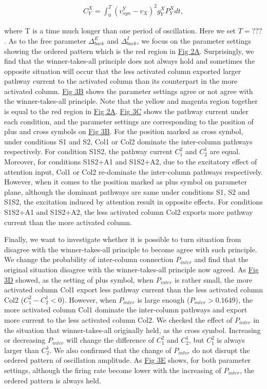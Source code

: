 \documentclass[10pt,letterpaper]{article}
\begin{document}
\begin{eqnarray}
\label{eq:6}
    C_{Y}^{X} = \int_{0}^{T}(v_{syn}^{Y}-v_{X})^{2}g_{Y}^{X}P_{Y}^{X}dt,
\end{eqnarray}

where T is a time much longer than one period of oscillation. Here we set $T=???$. As to the free parameter $\Delta_{back}^{E}$ and $\Delta_{back}^{I}$, we focus on the parameter settings showing the ordered pattern which is the red region in \hyperlink{fig:fig2}{Fig 2A}. Surprisingly, we find that the winner-takes-all principle does not always hold and sometimes the opposite situation will occur that the less activated column exported larger pathway current to the activated column than its counterpart in the more activated column. \hyperlink{fig:fig3}{Fig 3B} shows the parameter settings agree or not agree with the winner-takes-all principle. Note that the yellow and magenta region together is equal to the red region in \hyperlink{fig:fig2}{Fig 2A}. \hyperlink{fig:fig3}{Fig 3C} shows the pathway current under each condition, and the parameter settings are corresponding to the position of plus and cross symbols on \hyperlink{fig:fig3}{Fig 3B}. For the position marked as cross symbol, under conditions S1 and S2, Col1 or Col2 dominate the inter-column pathways respectively. For condition S1S2, the pathway current $C_{1}^{2}$ and $C_{2}^{1}$ are equal. Moreover, for conditions S1S2+A1 and S1S2+A2, due to the excitatory effect of attention input, Col1 or Col2 re-dominate the inter-column pathways respectively. However, when it comes to the position marked as plus symbol on parameter plane, although the dominant pathways are same under conditions S1, S2 and S1S2, the excitation induced by attention result in opposite effects. For conditions S1S2+A1 and S1S2+A2, the less activated column Col2 exports more pathway current than the more activated column.

Finally, we want to investigate whether it is possible to turn situation from disagree with the winner-takes-all principle to become agree with such principle. We change the probability of inter-column connection $P_{inter}$ and find that the original situation disagree with the winner-takes-all principle now agreed. As \hyperlink{fig:fig3}{Fig 3D} showed, as the setting of plus symbol, when $P_{inter}$ is rather small, the more activated column Col1 export less pathway current than the less activated column Col2 ($C_{1}^{2} - C_{2}^{1} < 0$). However, when $P_{inter}$ is large enough ($P_{inter}>0.1649$), the more activated column Col1 dominate the inter-column pathways and export more current to the less activated column Col2. We checked the effect of $P_{inter}$ in the situation that winner-takes-all originally held, as the cross symbol. Increasing or decreasing $P_{inter}$ will change the difference of $C_{1}^{2}$ and $C_{2}^{1}$, but $C_{1}^{2}$ is always larger than $C_{2}^{1}$. We also confirmed that the change of $P_{inter}$ do not disrupt the ordered pattern of oscillation amplitude. As \hyperlink{fig:fig3}{Fig 3E} shows, for both parameter settings, although the firing rate become lower with the increasing of $P_{inter}$, the ordered pattern is always held.
\end{document}
